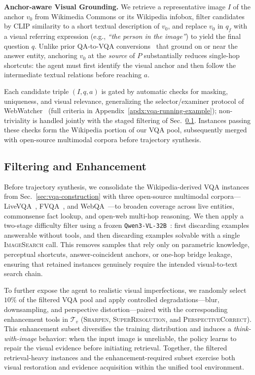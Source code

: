 \textbf{Anchor-aware Visual Grounding.}
We retrieve a representative image $I$ of the anchor $v_0$ from Wikimedia Commons or its Wikipedia infobox, filter candidates by CLIP similarity to a short textual description of $v_0$, and replace $v_0$ in $q_f$ with a visual referring expression (e.g., \emph{``the person in the image''}) to yield the final question $q$. Unlike prior QA-to-VQA conversions~\citep{webwatcher,zhang2025skywork} that ground on or near the answer entity, anchoring $v_0$ at the \emph{source} of $P$ substantially reduces single-hop shortcuts: the agent must first identify the visual anchor and then follow the intermediate textual relations before reaching $a$.


Each candidate triple $(I,q,a)$ is gated by automatic checks for masking, uniqueness, and visual relevance, generalizing the selector/examiner protocol of WebWatcher~\citep{webwatcher} (full criteria in Appendix~\ref{apdx:vqa-running-example}); non-triviality is handled jointly with the staged filtering of Sec.~\ref{sec:filtering-enhancement}. Instances passing these checks form the Wikipedia portion of our VQA pool, subsequently merged with open-source multimodal corpora before trajectory synthesis.


\subsection{Filtering and Enhancement}
\label{sec:filtering-enhancement}


Before trajectory synthesis, we consolidate the Wikipedia-derived VQA instances from Sec.~\ref{sec:vqa-construction} with three open-source multimodal corpora---LiveVQA~\citep{fu2025livevqa}, FVQA~\citep{wang2017fvqa}, and WebQA~\citep{chang2022webqamultihopmultimodalqa}---to broaden coverage across live entities, commonsense fact lookup, and open-web multi-hop reasoning. We then apply a two-stage difficulty filter using a frozen \texttt{Qwen3-VL-32B}~\citep{Qwen3-VL}: first discarding examples answerable without tools, and then discarding examples solvable with a single \textsc{ImageSearch} call. This removes samples that rely only on parametric knowledge, perceptual shortcuts, answer-coincident anchors, or one-hop bridge leakage, ensuring that retained instances genuinely require the intended visual-to-text search chain.

To further expose the agent to realistic visual imperfections, we randomly select $10\%$ of the filtered VQA pool and apply controlled degradations---blur, downsampling, and perspective distortion---paired with the corresponding enhancement tools in $\mathcal{T}_v$ (\textsc{Sharpen}, \textsc{SuperResolution}, and \textsc{PerspectiveCorrect}). This enhancement subset diversifies the training distribution and induces a \emph{think-with-image} behavior: when the input image is unreliable, the policy learns to repair the visual evidence before initiating retrieval. Together, the filtered retrieval-heavy instances and the enhancement-required subset exercise both visual restoration and evidence acquisition within the unified tool environment.


